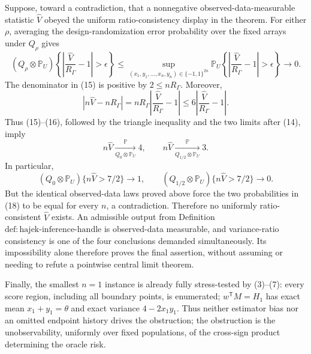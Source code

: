 Suppose, toward a contradiction, that a nonnegative observed-data-measurable statistic \(\widehat V\) obeyed the uniform ratio-consistency display in the theorem.  For either \(\rho\), averaging the design-randomization error probability over the fixed arrays under \(Q_\rho\) gives
\[
(Q_\rho\otimes\mathbb P_U)
\!\left\{\left|\frac{\widehat V}{R_\Gamma}-1\right|>\epsilon\right\}
\le
\sup_{(x_1,y_1,\ldots,x_n,y_n)\in\{-1,1\}^{2n}}
\mathbb P_U
\!\left\{\left|\frac{\widehat V}{R_\Gamma}-1\right|>\epsilon\right\}
\longrightarrow0.
\tag{15}
\]
The denominator in (15) is positive by \(2\le nR_\Gamma\).  Moreover,
\[
|n\widehat V-nR_\Gamma|
=nR_\Gamma\left|\frac{\widehat V}{R_\Gamma}-1\right|
\le6\left|\frac{\widehat V}{R_\Gamma}-1\right|.
\tag{16}
\]
Thus (15)--(16), followed by the triangle inequality and the two limits after (14), imply
\[
n\widehat V\xrightarrow[Q_0\otimes\mathbb P_U]{\mathbb P}4,
\qquad
n\widehat V\xrightarrow[Q_{1/2}\otimes\mathbb P_U]{\mathbb P}3.
\tag{17}
\]
In particular,
\[
(Q_0\otimes\mathbb P_U)\{n\widehat V>7/2\}\longrightarrow1,
\qquad
(Q_{1/2}\otimes\mathbb P_U)\{n\widehat V>7/2\}\longrightarrow0.
\tag{18}
\]
But the identical observed-data laws proved above force the two probabilities in (18) to be equal for every \(n\), a contradiction.  Therefore no uniformly ratio-consistent \(\widehat V\) exists.  An admissible output from Definition \(\mathrm{def:hajek\text{-}inference\text{-}handle}\) is observed-data measurable, and variance-ratio consistency is one of the four conclusions demanded simultaneously.  Its impossibility alone therefore proves the final assertion, without assuming or needing to refute a pointwise central limit theorem.

Finally, the smallest \(n=1\) instance is already fully stress-tested by (3)--(7): every score region, including all boundary points, is enumerated; \(w^{\mathsf T}M=H_1\) has exact mean \(x_1+y_1=\theta\) and exact variance \(4-2x_1y_1\).  Thus neither estimator bias nor an omitted endpoint history drives the obstruction; the obstruction is the unobservability, uniformly over fixed populations, of the cross-sign product determining the oracle risk.